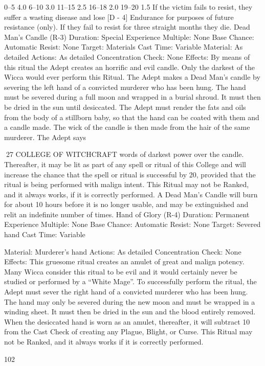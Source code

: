 \documentclass[a4paper]{article}
\begin{document}
\begin{multicols}{3}
0–5
4.0
6–10
3.0
11–15 2.5
16–18 2.0
19–20 1.5
If the victim fails to resist, they suffer a wasting
disease and lose [D - 4] Endurance for purposes of
future resistance (only). If they fail to resist for
three straight months they die.
Dead Man’s Candle (R-3)
Duration: Special
Experience Multiple: None Base Chance: Automatic
Resist: None
Target: Materials
Cast Time: Variable
Material: As detailed
Actions: As detailed
Concentration Check: None
Effects: By means of this ritual the Adept creates
an horrific and evil candle. Only the darkest of the
Wicca would ever perform this Ritual. The Adept
makes a Dead Man’s candle by severing the left
hand of a convicted murderer who has been hung.
The hand must be severed during a full moon and
wrapped in a burial shroud. It must then be dried in
the sun until desiccated. The Adept must render the
fats and oils from the body of a stillborn baby, so
that the hand can be coated with them and a candle
made. The wick of the candle is then made from
the hair of the same murderer. The Adept says

27 COLLEGE OF WITCHCRAFT
words of darkest power over the candle. Thereafter, it may be lit as part of any spell or ritual of this
College and will increase the chance that the spell
or ritual is successful by 20, provided that the ritual
is being performed with malign intent. This Ritual
may not be Ranked, and it always works, if it is
correctly performed. A Dead Man’s Candle will
burn for about 10 hours before it is no longer usable, and may be extinguished and relit an indefinite number of times.
Hand of Glory (R-4)
Duration: Permanent
Experience Multiple: None Base Chance: Automatic
Resist: None
Target: Severed hand
Cast Time: Variable

Material: Murderer’s hand
Actions: As detailed
Concentration Check: None
Effects: This gruesome ritual creates an amulet of
great and malign potency. Many Wicca consider
this ritual to be evil and it would certainly never be
studied or performed by a “White Mage”. To successfully perform the ritual, the Adept must sever
the right hand of a convicted murderer who has
been hung. The hand may only be severed during
the new moon and must be wrapped in a winding
sheet. It must then be dried in the sun and the blood
entirely removed. When the desiccated hand is
worn as an amulet, thereafter, it will subtract 10
from the Cast Check of creating any Plague,
Blight, or Curse. This Ritual may not be Ranked,
and it always works if it is correctly performed.

102


\end{multicols}
\end{document}
